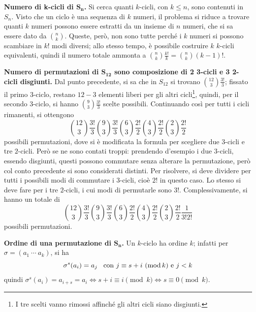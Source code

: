 \documentclass[12pt]{scrartcl}
\theoremstyle{style}
\numberwithin{equation}{subsection}
\begin{document}
\textbf{Numero di k-cicli di $\mathbf{S_n}$.} Si cerca quanti $k$-cicli, con $k\le n$, sono contenuti in $S_n$.
Visto che un ciclo \`e una sequenza di $k$ numeri, il problema si riduce a trovare quanti $k$ numeri possono essere estratti da un insieme di $n$ numeri, che si sa essere dato da $\binom{n}{k}$.
Queste, per\`o, non sono tutte perch\'e i $k$ numeri si possono scambiare in $k!$ modi diversi; allo stesso tempo, \`e possibile costruire $k$ $k$-cicli equivalenti, quindi il numero totale ammonta a $\binom{n}{k}\frac{k!}{k} = \binom{n}{k} (k-1)!$.

\vspace{5pt}

\textbf{Numero di permutazioni di $\mathbf{S_{12}} $ sono composizione di 2 3-cicli e 3 2-cicli disgiunti.} 
Dal punto precedente, si sa che in $S_{12}$ si trovano $\binom{12}{3}\frac{3!}{3} $; fissato il primo $3$-ciclo, restano $12-3$ elementi liberi per gli altri cicli\footnote{I tre scelti vanno rimossi affinch\'e gli altri cicli siano disgiunti.}, quindi, per il secondo $3$-ciclo, si hanno $\binom{9}{3}\frac{3!}{3}$ scelte possibili.
Continuando cos\`i per tutti i cicli rimanenti, si ottengono
\[
\binom{12}{3}\frac{3!}{3}  \binom{9}{3}\frac{3!}{3} \binom{6}{3}\frac{2!}{2} \binom{4}{3}\frac{2!}{2} \binom{2}{3}\frac{2!}{2} 
\] 
possibili permutazioni, dove si \`e modificata la formula per scegliere due $3$-cicli e tre $2$-cicli.
Per\`o se ne sono contati troppi: prendendo d'esempio i due $3$-cicli, essendo disgiunti, questi possono commutare senza alterare la permutazione, per\`o col conto precedente si sono considerati distinti.
Per risolvere, si deve dividere per tutti i possibili modi di commutare i $3$-cicli, cio\`e $2!$ in questo caso. 
Lo stesso si deve fare per i tre $2$-cicli, i cui modi di permutarle sono $3!$.
Complessivamente, si hanno un totale di 
\[
\binom{12}{3}\frac{3!}{3}  \binom{9}{3}\frac{3!}{3} \binom{6}{3}\frac{2!}{2} \binom{4}{3}\frac{2!}{2} \binom{2}{3}\frac{2!}{2} \frac{1}{3!2!}
\] 
possibili permutazioni.

\vspace{5pt}
\textbf{Ordine di una permutazione di $\mathbf{S_n}$.}  
Un $k$-ciclo ha ordine $k$; infatti per $\sigma = (a_1 \ \cdots\ a_k)$, si ha
\[
	\sigma ^s(a_i)=a_j \hspace{.3cm} \text{con } j\equiv s+i\ (\operatorname{mod} k) \text{ e }j<k 
\] 
quindi $\sigma ^s (a_i) = a_{i+s } = a_i \iff s+i \equiv i \pmod{k}\iff s \equiv 0 \pmod{k}  $.
\end{document}
